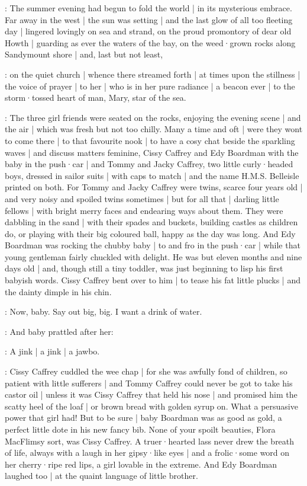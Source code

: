 \Nnovel:
The summer evening
had begun to fold the world |
in its mysterious embrace.
Far away in the west |
the sun was setting |
and the last glow of all too fleeting day |
lingered lovingly on sea and strand,
on the proud promontory
of dear old Howth |
guarding as ever
the waters of the bay,
on the weed·grown rocks along Sandymount shore |
and,
last but not least,

\Nrelig:
on the quiet church |
whence there streamed forth |
at times upon the stillness |
the voice of prayer |
to her |
who is in her pure radiance |
a beacon ever |
to the storm·tossed heart of man,
Mary,
star of the sea.

\Nnovel:
The three girl friends were seated on the rocks,
enjoying the evening scene |
and the air |
which was fresh but not too chilly.%
Many a time and oft |
were they wont to come there |
to that favourite nook |
to have a cosy chat
beside the sparkling waves |
and discuss matters feminine,
Cissy Caffrey
and Edy Boardman with the baby in the push·car |
and Tommy and Jacky Caffrey,
two little curly·headed boys,
dressed in sailor suits |
with caps to match |
and the name H.M.S. Belleisle printed on both.
For Tommy and Jacky Caffrey were twins,
scarce four years old |
and very noisy and spoiled twins sometimes |
but for all that |
darling little fellows |
with bright merry faces and endearing ways about them.
They were dabbling in the sand |
with their spades and buckets,
building castles as children do,
or playing with their big coloured ball,
happy as the day was long.%
And Edy Boardman was rocking the chubby baby |
to and fro in the push·car |
while that young gentleman
fairly chuckled with delight.
He was but eleven months and nine days old |
and,
though still a tiny toddler,
was just beginning to lisp his first babyish words.
Cissy Caffrey bent over to him |
to tease his fat little plucks |
and the dainty dimple in his chin.

\cissy:
Now,
baby.
Say out big,
big.
I want a drink of water.

:
And baby prattled after her:

\baby:
A jink |
a jink |
a jawbo.

\Nnovel:
Cissy Caffrey cuddled the wee chap |
for she was awfully fond of children,
so patient with little sufferers |%
and Tommy Caffrey could never be got to take his castor oil |
unless it was Cissy Caffrey that held his nose |
and promised him the scatty heel of the loaf |
or brown bread with golden syrup on.
What a persuasive power that girl had!
But to be sure |
baby Boardman was as good as gold,
a perfect little dote in his new fancy bib.
None of your spoilt beauties,
Flora MacFlimsy sort,
was Cissy Caffrey.
A truer·hearted lass never drew the breath of life,
always with a laugh in her gipsy·like eyes |
and a frolic·some word on her cherry·ripe red lips,
a girl lovable in the extreme.
And Edy Boardman laughed too |
at the quaint language of little brother.

